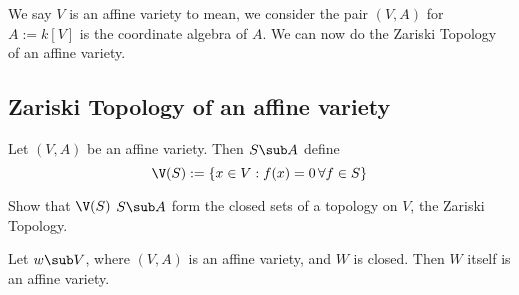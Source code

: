 We say $V$ is an affine variety to mean, we consider the pair $(V, A)$ for $A := k[V]$ is the coordinate algebra of $A$. We can now do the Zariski Topology of an affine variety.

\subsection{Zariski Topology of an affine variety}
Let $(V, A)$ be an affine variety. Then $S \sub A$ define
$$ \V(S) := \{x \in V : f(x) = 0 \,\forall f \in S\} $$
\begin{exercise}
  Show that $\V(S)$ $S \sub A$ form the closed sets of a topology on $V$, the Zariski Topology.
\end{exercise}

\begin{nprop}
  Let $w \sub V$, where $(V, A)$ is an affine variety, and $W$ is closed. Then $W$ itself is an affine variety.
\end{nprop}
